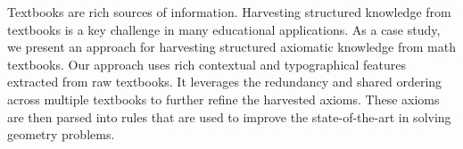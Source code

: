 Textbooks are rich sources of information. Harvesting structured knowledge from textbooks is a key challenge in many educational applications. As a case study, we present an approach for harvesting structured axiomatic knowledge from math textbooks. Our approach uses rich contextual and typographical features extracted from raw textbooks. It leverages the redundancy and shared ordering across multiple textbooks to further refine the harvested axioms. These axioms are then parsed into rules that are used to improve the state-of-the-art in solving geometry problems.
